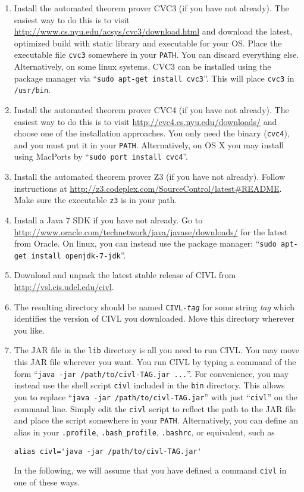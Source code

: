 \begin{enumerate}
\item Install the automated theorem prover CVC3 (if you have not
  already).  The easiest way to do this is to visit
  \url{http://www.cs.nyu.edu/acsys/cvc3/download.html} and download
  the latest, optimized build with static library and executable for
  your OS.  Place the executable file \texttt{cvc3} somewhere in your
  \texttt{PATH}.  You can discard everything else.  Alternatively, on
  some linux systems, CVC3 can be installed using the package manager
  via ``\texttt{sudo apt-get install cvc3}''.  This will place
  \texttt{cvc3} in \texttt{/usr/bin}.

\item Install the automated theorem prover CVC4 (if you have not
  already).  The easiest way to do this is to visit
  \url{http://cvc4.cs.nyu.edu/downloads/} and choose one of the
  installation approaches.  You only need the binary (\texttt{cvc4}),
  and you must put it in your \texttt{PATH}.  Alternatively, on OS X
  you may install using MacPorts by ``\texttt{sudo port install
    cvc4}''.

\item Install the automated theorem prover Z3 (if you have not
  already).  Follow instructions at
  \url{http://z3.codeplex.com/SourceControl/latest#README}.  Make sure
  the executable \texttt{z3} is in your path.

\item Install a Java 7 SDK if you have not already.  Go to
  \url{http://www.oracle.com/technetwork/java/javase/downloads/} for
  the latest from Oracle.  On linux, you can instead use the package
  manager: ``\texttt{sudo apt-get install openjdk-7-jdk}''.

\item Download and unpack the latest stable release of CIVL from
  \url{http://vsl.cis.udel.edu/civl}.

\item The resulting directory should be named
  \texttt{CIVL-\textit{tag}} for some string \textit{tag} which
  identifies the version of CIVL you downloaded.  Move this directory
  wherever you like.

\item The JAR file in the \texttt{lib} directory is all you need to
  run CIVL.  You may move this JAR file wherever you want.  You run
  CIVL by typing a command of the form ``\texttt{java -jar
    /path/to/civl-TAG.jar ...}''.  For convenience, you may instead
  use the shell script \texttt{civl} included in the \texttt{bin}
  directory.  This allows you to replace ``\texttt{java -jar
    /path/to/civl-TAG.jar}'' with just ``\texttt{civl}'' on the
  command line.  Simply edit the \texttt{civl} script to reflect the
  path to the JAR file and place the script somewhere in your
  \texttt{PATH}.  Alternatively, you can define an alias in your
  \texttt{.profile}, \verb!.bash_profile!, \texttt{.bashrc}, or
  equivalent, such as
\begin{verbatim}
alias civl='java -jar /path/to/civl-TAG.jar'
\end{verbatim}
  In the following, we will assume that you have defined a command
  \texttt{civl} in one of these ways.


\end{enumerate}
